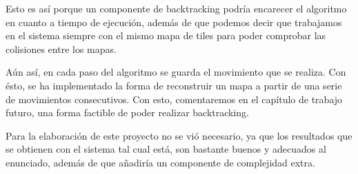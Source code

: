 Esto es así porque un componente de backtracking podría encarecer el algoritmo en cuanto a tiempo de ejecución, además de que podemos decir que trabajamos en el sistema siempre con el mismo mapa de tiles para poder comprobar las colisiones entre los mapas.

Aún así, en cada paso del algoritmo se guarda el movimiento que se realiza. Con ésto, se ha implementado la forma de reconstruir un mapa a partir de una serie de movimientos consecutivos. Con esto, comentaremos en el capítulo de trabajo futuro, una forma factible de poder realizar backtracking.

Para la elaboración de este proyecto no se vió necesario, ya que los resultados que se obtienen con el sistema tal cual está, son bastante buenos y adecuados al enunciado, además de que añadiría un componente de complejidad extra.
